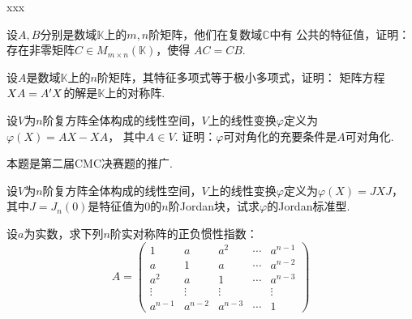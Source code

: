 \begin{groups}
    \begin{questions}
        \question xxx
    \end{questions}

    \begin{questions}
        \question 
        设$A,B$分别是数域$\mathbb{K}$上的$m,n$阶矩阵，他们在复数域$\mathbb{C}$中有
        公共的特征值，证明：存在非零矩阵$C \in M_{m \times n}(\mathbb{K})$，使得
        $AC=CB$.
    \end{questions}

    \begin{questions}
        \question 
        设$A$是数域$\mathbb{K}$上的$n$阶矩阵，其特征多项式等于极小多项式，证明：
        矩阵方程$XA=A^{\prime}X$的解是$\mathbb{K} $上的对称阵.
    \end{questions}

    \begin{questions}
        \question 
        设$V$为$n$阶复方阵全体构成的线性空间，$V$上的线性变换$\varphi$定义为$\varphi(X)=AX-XA$，
        其中$A \in V$. 证明：$\varphi$可对角化的充要条件是$A$可对角化.
    \end{questions}

    \begin{remark}
        本题是第二届CMC决赛题的推广. 
    \end{remark}

    \begin{questions}
        \question 
        设$V$为$n$阶复方阵全体构成的线性空间，$V$上的线性变换$\varphi$定义为$\varphi(X)=JXJ$，
        其中$J=J_n(0)$是特征值为$0$的$n$阶Jordan块，试求$\varphi$的Jordan标准型.
    \end{questions}

    \begin{questions}
        \question 
        设$a$为实数，求下列$n$阶实对称阵的正负惯性指数：
        $$
            A = \begin{pmatrix}
                1 & a & a^2 & \cdots & a^{n-1} \\
                a & 1 & a & \cdots & a^{n-2} \\
                a^2 & a & 1 & \cdots & a^{n-3} \\
                \vdots & \vdots & \vdots & & \vdots \\
                a^{n-1} & a^{n-2} & a^{n-3} & \cdots & 1
            \end{pmatrix}
        $$
    \end{questions}


\end{groups}

